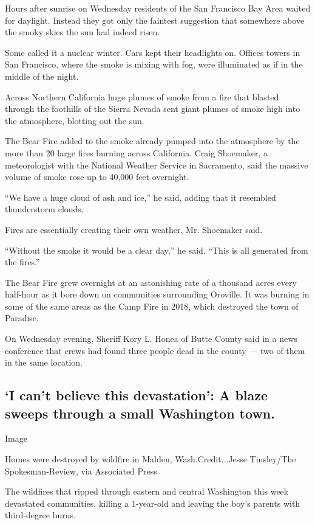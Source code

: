 Hours after sunrise on Wednesday residents of the San Francisco Bay Area
waited for daylight. Instead they got only the faintest suggestion that
somewhere above the smoky skies the sun had indeed risen.

Some called it a nuclear winter. Cars kept their headlights on. Offices
towers in San Francisco, where the smoke is mixing with fog, were
illuminated as if in the middle of the night.

Across Northern California huge plumes of smoke from a fire that blasted
through the foothills of the Sierra Nevada sent giant plumes of smoke
high into the atmosphere, blotting out the sun.

The Bear Fire added to the smoke already pumped into the atmosphere by
the more than 20 large fires burning across California. Craig Shoemaker,
a meteorologist with the National Weather Service in Sacramento, said
the massive volume of smoke rose up to 40,000 feet overnight.

``We have a huge cloud of ash and ice,'' he said, adding that it
resembled thunderstorm clouds.

Fires are essentially creating their own weather, Mr. Shoemaker said.

``Without the smoke it would be a clear day,'' he said. ``This is all
generated from the fires.''

The Bear Fire grew overnight at an astonishing rate of a thousand acres
every half-hour as it bore down on communities surrounding Oroville. It
was burning in some of the same areas as the Camp Fire in 2018, which
destroyed the town of Paradise.

On Wednesday evening, Sheriff Kory L. Honea of Butte County said in a
news conference that crews had found three people dead in the county ---
two of them in the same location.

\hypertarget{i-cant-believe-this-devastation-a-blaze-sweeps-through-a-small-washington-town}{%
\subsection{`I can't believe this devastation': A blaze sweeps through a
small Washington
town.}\label{i-cant-believe-this-devastation-a-blaze-sweeps-through-a-small-washington-town}}

Image

Homes were destroyed by wildfire in Malden, Wash.Credit...Jesse
Tinsley/The Spokesman-Review, via Associated Press

The wildfires that ripped through eastern and central Washington this
week devastated communities, killing a 1-year-old and leaving the boy's
parents with third-degree burns.

